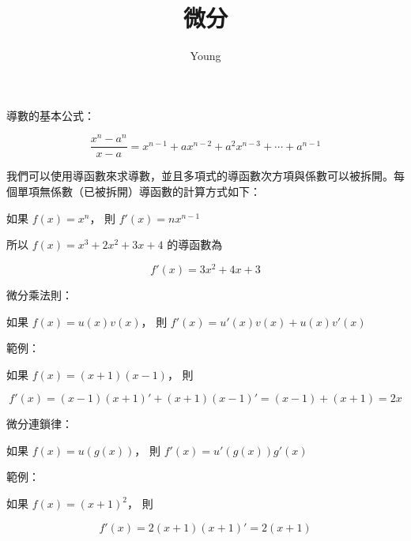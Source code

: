 \documentclass{article}
\title{微分}
\author{Young}
\date{}
\begin{document}
\maketitle

導數的基本公式：

\[
\frac{x^n - a^n}{x-a} = x^{n-1} + ax^{n-2} + a^2x^{n-3} + \cdots + a^{n-1}
\]

我們可以使用導函數來求導數，並且多項式的導函數次方項與係數可以被拆開。每個單項無係數（已被拆開）導函數的計算方式如下：

如果 $f(x) = x^n$， 則 $f'(x) = nx^{n-1}$

所以 $f(x) = x^3 + 2x^2 + 3x + 4$ 的導函數為

\[
f'(x) = 3x^2 + 4x + 3
\]

微分乘法則：

如果 $f(x) = u(x)v(x)$， 則 $f'(x) = u'(x)v(x) + u(x)v'(x)$

範例：

如果 $f(x) = (x+1)(x-1)$， 則

\[
f'(x) = (x-1)(x+1)' + (x+1)(x-1)' = (x-1) + (x+1) = 2x
\]

微分連鎖律：

如果 $f(x) = u(g(x))$， 則 $f'(x) = u'(g(x))g'(x)$

範例：

如果 $f(x) = (x+1)^2$， 則

\[
f'(x) = 2(x+1)(x+1)' = 2(x+1)
\]
\end{document}
